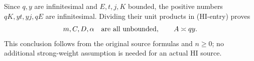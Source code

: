 Since $q,y$ are infinitesimal and $E,t,j,K$ bounded, the positive
numbers $qK,yt,yj,qE$ are infinitesimal. Dividing their unit
products in (HI-entry) proves
\[
 m,C,D,\alpha\quad\hbox{are all unbounded},\qquad
 A\asymp qy.
\]
This conclusion follows from the original source formulas and
$n\geq0$; no additional strong-weight assumption is needed for
an actual HI source.
